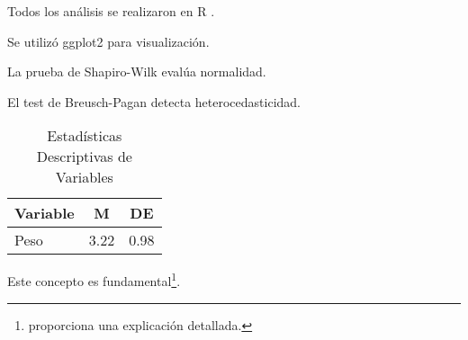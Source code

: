 
Todos los análisis se realizaron en R \parencite{rcore2023}.

Se utilizó ggplot2 \parencite{wickham2016} para visualización.


La prueba de Shapiro-Wilk \parencite{shapiro1965} evalúa normalidad.

El test de Breusch-Pagan \parencite{breusch1979} detecta heterocedasticidad.


\begin{table}[H]
    \centering
    \caption{Estadísticas Descriptivas de Variables \parencite{motor1974}}
    \begin{tabular}{lcc}
        \toprule \textbf{Variable} & \textbf{M} & \textbf{DE} \\
        \midrule Peso              & 3.22       & 0.98        \\
        \bottomrule
    \end{tabular}
    \label{tab:ejemplo}
\end{table}




Este concepto es fundamental\footnote{\textcite{montgomery2012} proporciona una explicación
detallada.}.


